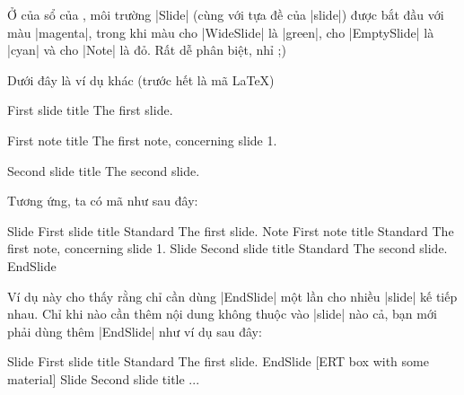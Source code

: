 Ở của sổ của \LyX, môi trường |Slide| (cùng với tựa đề của |slide|)
được bắt đầu với màu |magenta|, trong khi màu cho |WideSlide| là |green|,
cho |EmptySlide| là |cyan| và cho |Note| là đỏ. Rất dễ phân biệt, nhỉ ;)

Dưới đây là ví dụ khác (trước hết là mã \LaTeX{})
\begin{example}
 \begin{slide}{First slide title}
   The first slide.
 \end{slide}
 \begin{note}{First note title}
   The first note, concerning slide 1.
 \end{note}
 \begin{slide}{Second slide title}
   The second slide.
 \end{slide}
\end{example}
Tương ứng, ta có mã \LyX{} như sau đây:
\begin{example}
 Slide         First slide title
 Standard      The first slide.
 Note          First note title
 Standard      The first note, concerning slide 1.
 Slide         Second slide title
 Standard      The second slide.
 EndSlide
\end{example}
Ví dụ này cho thấy rằng chỉ cần dùng |EndSlide| một lần cho nhiều |slide|
kế tiếp nhau. Chỉ khi nào cần thêm nội dung không thuộc vào |slide| nào cả,
bạn mới phải dùng thêm |EndSlide| như ví dụ sau đây:
\begin{example}
 Slide         First slide title
 Standard      The first slide.
 EndSlide
 [ERT box with some material]
 Slide         Second slide title
 ...
\end{example}
